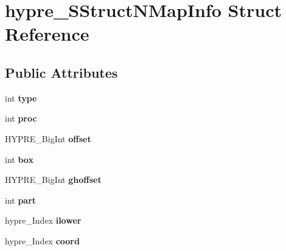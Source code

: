 \hypertarget{structhypre__SStructNMapInfo}{}\section{hypre\+\_\+\+S\+Struct\+N\+Map\+Info Struct Reference}
\label{structhypre__SStructNMapInfo}
\subsection*{Public Attributes}
\begin{DoxyCompactItemize}
\item 
\hypertarget{structhypre__SStructNMapInfo_a0a8ee9d1a28134e9810027445f437014}{}int {\bfseries type}\label{structhypre__SStructNMapInfo_a0a8ee9d1a28134e9810027445f437014}

\item 
\hypertarget{structhypre__SStructNMapInfo_a788f56a61a112b38c2aafe4863243b4f}{}int {\bfseries proc}\label{structhypre__SStructNMapInfo_a788f56a61a112b38c2aafe4863243b4f}

\item 
\hypertarget{structhypre__SStructNMapInfo_a0b01a6179a0b50fa23127c2822f996bd}{}H\+Y\+P\+R\+E\+\_\+\+Big\+Int {\bfseries offset}\label{structhypre__SStructNMapInfo_a0b01a6179a0b50fa23127c2822f996bd}

\item 
\hypertarget{structhypre__SStructNMapInfo_a299e5d3c817633b742c1e4fffe77a294}{}int {\bfseries box}\label{structhypre__SStructNMapInfo_a299e5d3c817633b742c1e4fffe77a294}

\item 
\hypertarget{structhypre__SStructNMapInfo_a8d67b93dfe0a383eae6a08b56faa75eb}{}H\+Y\+P\+R\+E\+\_\+\+Big\+Int {\bfseries ghoffset}\label{structhypre__SStructNMapInfo_a8d67b93dfe0a383eae6a08b56faa75eb}

\item 
\hypertarget{structhypre__SStructNMapInfo_a43b457e3d3e35fd3561d116c3e3370a3}{}int {\bfseries part}\label{structhypre__SStructNMapInfo_a43b457e3d3e35fd3561d116c3e3370a3}

\item 
\hypertarget{structhypre__SStructNMapInfo_afadc6f51f89397511070139354f2ebf3}{}hypre\+\_\+\+Index {\bfseries ilower}\label{structhypre__SStructNMapInfo_afadc6f51f89397511070139354f2ebf3}

\item 
\hypertarget{structhypre__SStructNMapInfo_a8a2264771c5a258019fd8b82121051c0}{}hypre\+\_\+\+Index {\bfseries coord}\label{structhypre__SStructNMapInfo_a8a2264771c5a258019fd8b82121051c0}


\end{DoxyCompactItemize}

